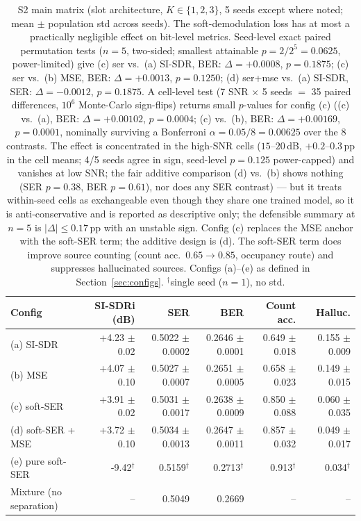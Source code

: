 \documentclass[review,12pt]{elsarticle}
\begin{document}
\begin{table}[H]
\centering
\caption{S2 main matrix (slot architecture, $K\in\{1,2,3\}$, 5 seeds except where noted; mean $\pm$ population std across seeds). The soft-demodulation loss has at most a practically negligible effect on bit-level metrics. Seed-level exact paired permutation tests ($n{=}5$, two-sided; smallest attainable $p{=}2/2^5{=}0.0625$, power-limited) give (c) ser vs.\ (a) SI-SDR, BER: $\Delta{=}+0.0008$, $p{=}0.1875$; (c) ser vs.\ (b) MSE, BER: $\Delta{=}+0.0013$, $p{=}0.1250$; (d) ser+mse vs.\ (a) SI-SDR, SER: $\Delta{=}-0.0012$, $p{=}0.1875$. A cell-level test (7 SNR $\times$ 5 seeds $=$ 35 paired differences, $10^6$ Monte-Carlo sign-flips) returns small $p$-values for config (c) ((c) vs.\ (a), BER: $\Delta{=}+0.00102$, $p{=}0.0004$; (c) vs.\ (b), BER: $\Delta{=}+0.00169$, $p{=}0.0001$, nominally surviving a Bonferroni $\alpha{=}0.05/8{=}0.00625$ over the 8 contrasts. The effect is concentrated in the high-SNR cells ($15$--$20$\,dB, $+0.2$--$0.3$\,pp in the cell means; 4/5 seeds agree in sign, seed-level $p{=}0.125$ power-capped) and vanishes at low SNR; the fair additive comparison (d) vs.\ (b) shows nothing (SER $p{=}0.38$, BER $p{=}0.61$), nor does any SER contrast) --- but it treats within-seed cells as exchangeable even though they share one trained model, so it is anti-conservative and is reported as descriptive only; the defensible summary at $n{=}5$ is $|\Delta| \le 0.17$\,pp with an unstable sign. Config (c) replaces the MSE anchor with the soft-SER term; the additive design is (d). The soft-SER term does improve source counting (count acc.\ $0.65\!\rightarrow\!0.85$, occupancy route) and suppresses hallucinated sources. Configs (a)--(e) as defined in Section~\ref{sec:configs}. $^{\dagger}$single seed ($n{=}1$), no std.}
\label{tab:s2_main}
\setlength{\tabcolsep}{2pt}
\scriptsize
\begin{tabular}{l r r r r r}
\toprule
Config & SI-SDRi (dB) & SER & BER & Count acc. & Halluc. \\
\midrule
(a) SI-SDR & +4.23 $\pm$ 0.02 & 0.5022 $\pm$ 0.0002 & 0.2646 $\pm$ 0.0001 & 0.649 $\pm$ 0.018 & 0.155 $\pm$ 0.009 \\
(b) MSE & +4.07 $\pm$ 0.10 & 0.5027 $\pm$ 0.0007 & 0.2651 $\pm$ 0.0005 & 0.658 $\pm$ 0.023 & 0.149 $\pm$ 0.015 \\
(c) soft-SER & +3.91 $\pm$ 0.02 & 0.5031 $\pm$ 0.0017 & 0.2638 $\pm$ 0.0009 & 0.850 $\pm$ 0.088 & 0.060 $\pm$ 0.035 \\
(d) soft-SER + MSE & +3.72 $\pm$ 0.10 & 0.5034 $\pm$ 0.0013 & 0.2647 $\pm$ 0.0011 & 0.857 $\pm$ 0.032 & 0.049 $\pm$ 0.017 \\
(e) pure soft-SER & -9.42$^{\dagger}$ & 0.5159$^{\dagger}$ & 0.2713$^{\dagger}$ & 0.913$^{\dagger}$ & 0.034$^{\dagger}$ \\
Mixture (no separation) & -- & 0.5049 & 0.2669 & -- & -- \\
\bottomrule
\end{tabular}
\end{table}
\end{document}

